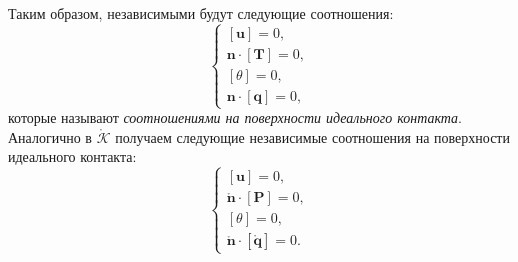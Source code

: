 Таким образом, независимыми будут следующие соотношения:
\begin{equation}
	\begin{cases}
		[\mathbf{u}] = 0, \\
		\mathbf{n} \cdot [\mathbf{T}] = 0, \\
		[\theta] = 0, \\
		\mathbf{n} \cdot [\mathbf{q}] = 0,
	\end{cases}
\end{equation}
которые называют \textit{соотношениями на поверхности идеального контакта}.
Аналогично в $\mathring{\mathcal{K}}$ получаем следующие независимые соотношения на поверхности идеального контакта:
\begin{equation*}
	\begin{cases}
		[\mathbf{u}] = 0, \\
		\mathring{\mathbf{n}} \cdot [\mathbf{P}] = 0, \\
		[\theta] = 0, \\
		\mathring{\mathbf{n}} \cdot [\mathring{\mathbf{q}}] = 0.
	\end{cases}
\end{equation*}
